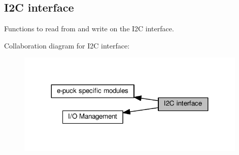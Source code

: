 \hypertarget{group__i2c}{}\subsection{I2\+C interface}
\label{group__i2c}


Functions to read from and write on the I2\+C interface.  


Collaboration diagram for I2\+C interface\+:\nopagebreak
\begin{figure}[H]
\begin{center}
\leavevmode
\includegraphics[width=311pt]{d3/df5/group__i2c}
\end{center}
\end{figure}
